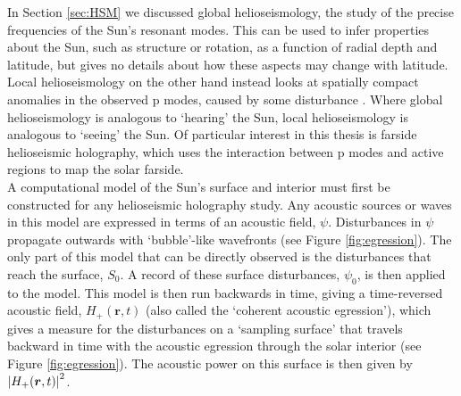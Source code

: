 \documentclass[11pt,a4paper,onecolumn]{report}
\DeclarePairedDelimiter{\abs}{\lvert}{\rvert}
\begin{document}
In Section \ref{sec:HSM} we discussed global helioseismology, the
study of the precise frequencies of the Sun's resonant modes. This can be used
to infer properties about the Sun, such as structure or rotation, as a function
of radial depth and latitude, but gives no details about how these aspects may
change with latitude. Local helioseismology on the other hand instead looks at
spatially compact anomalies in the observed p modes, caused by some disturbance
\citep{braun_absorption_1988}. Where global helioseismology is analogous to
`hearing' the Sun, local helioseismology is analogous to `seeing' the Sun. Of
particular interest in this thesis is farside helioseismic holography, which
uses the interaction between p modes and active regions to map the solar farside. \\




A computational model of the Sun's surface and interior must first be constructed for
any helioseismic holography study. Any acoustic sources or waves in this model
are expressed in terms of an acoustic field, \(\psi\). Disturbances in \(\psi\)
propagate outwards with `bubble'-like wavefronts (see Figure
\ref{fig:egression}). The only part of this model that can be directly observed
is the disturbances that reach the surface, \(S_0\). A record of these surface
disturbances, \(\psi_0\), is then applied to the model. This model is then run
backwards in time, giving a time-reversed acoustic field, \(H_+(\bm{r}, t)\)
(also called the `coherent acoustic egression'), which gives a measure for the
disturbances on a `sampling surface' that travels backward in time with the
acoustic egression through the solar interior (see Figure \ref{fig:egression}).
The acoustic power on this surface is then given by \(\abs*{H_+(\bm{r},
t)}^2\).\\
\end{document}
